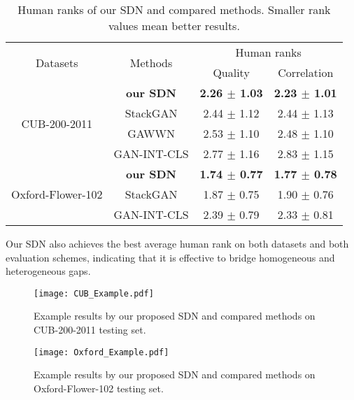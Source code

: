 \documentclass[sigconf]{acmart}
\begin{document}
\begin{table}[htb]
	\caption{Human ranks of our SDN and compared methods. Smaller rank values mean better results.}
	\begin{center}
		\begin{tabular}{|c|c|c|c|}
			\hline
			\multirow{2}{*}{Datasets} & \multirow{2}{*}{Methods} & \multicolumn{2}{|c|}{Human ranks} \\
			\cline{3-4}
			& & Quality & Correlation \\
			\hline
			\multirow{4}{1.5cm}{CUB-200-2011} & \textbf{our SDN} & \textbf{2.26 $\pm$ 1.03} & \textbf{2.23 $\pm$ 1.01} \\
			& StackGAN & 2.44 $\pm$ 1.12 & 2.44 $\pm$ 1.13 \\
			& GAWWN & 2.53 $\pm$ 1.10 & 2.48 $\pm$ 1.10 \\
			& GAN-INT-CLS & 2.77 $\pm$ 1.16 & 2.83 $\pm$ 1.15 \\
			\hline
			
			\multirow{3}{1.5cm}{Oxford-Flower-102} & \textbf{our SDN} & \textbf{1.74 $\pm$ 0.77} & \textbf{1.77 $\pm$ 0.78}  \\
			& StackGAN & 1.87 $\pm$ 0.75 & 1.90 $\pm$ 0.76 \\
			& GAN-INT-CLS & 2.39 $\pm$ 0.79 & 2.33 $\pm$ 0.81 \\
			\hline
		\end{tabular} 
	\end{center}
	\label{table:Human}
\end{table}

Our SDN also achieves the best average human rank on both datasets and both evaluation schemes, indicating that it is effective to bridge homogeneous and heterogeneous gaps. 

\begin{figure*}
	\begin{center}
		\texttt{[image: CUB\_Example.pdf]}
	\end{center}
	\caption{Example results by our proposed SDN and compared methods on CUB-200-2011 testing set.}
	\label{fig:cub_example}
\end{figure*}

\begin{figure*}
	\begin{center}
		\texttt{[image: Oxford\_Example.pdf]}
	\end{center}
	\caption{Example results by our proposed SDN and compared methods on Oxford-Flower-102 testing set.}
	\label{fig:oxford_example}
\end{figure*}
\end{document}
